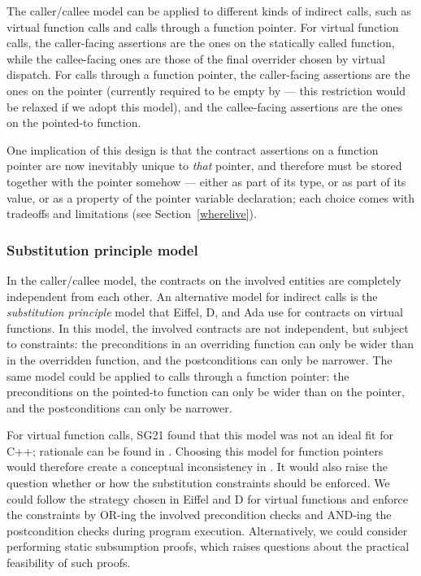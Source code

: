 The caller/callee model can be applied to different kinds of indirect calls, such as virtual function calls and calls through a function pointer. For virtual function calls, the caller-facing assertions are the ones on the statically called function, while the callee-facing ones are those of the final overrider chosen by virtual dispatch. For calls through a function pointer, the caller-facing assertions are the ones on the pointer (currently required to be empty by \cite{P2900R8} --- this restriction would be relaxed if we adopt this model), and the callee-facing assertions are the ones on the pointed-to function.

One implication of this design is that the contract assertions on a function pointer are now inevitably unique to \emph{that} pointer, and therefore must be stored together with the pointer somehow --- either as part of its type, or as part of its value, or as a property of the pointer variable declaration; each choice comes with  tradeoffs and limitations (see Section~\ref{wherelive}).

\subsubsection{Substitution principle model}
\label{submodel}

In the caller/callee model, the contracts on the involved entities are completely independent from each other. An alternative model for indirect calls is the \emph{substitution principle} model that Eiffel, D, and Ada use for contracts on virtual functions. In this model, the involved contracts are not independent, but subject to constraints: the preconditions in an overriding function can only be wider than in the overridden function, and the postconditions can only be narrower. The same model could be applied to calls through a function pointer: the preconditions on the pointed-to function can only be wider than on the pointer, and the postconditions can only be narrower.

For virtual function calls, SG21 found that this model was not an ideal fit for C++; rationale can be found in \cite{P3097R0}. Choosing this model for function pointers would therefore create a conceptual inconsistency in \cite{P2900R8}. It would also raise the question whether or how the substitution constraints should be enforced. We could follow the strategy chosen in Eiffel and D for virtual functions and enforce the constraints by OR-ing the involved precondition checks and AND-ing the postcondition checks during program execution. Alternatively, we could consider performing static subsumption proofs, which raises questions about the practical feasibility of such proofs.

